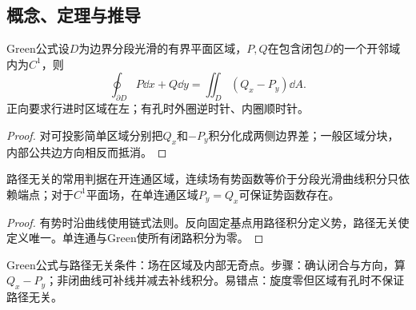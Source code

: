 \subsection{概念、定理与推导}

\begin{theorem}{Green公式}设$D$为边界分段光滑的有界平面区域，$P,Q$在包含闭包$\overline D$的一个开邻域内为$C^1$，则
\begin{equation}\oint_{\partial D}P\dd x+Q\dd y=\iint_D(Q_x-P_y)\dd A.\end{equation}
正向要求行进时区域在左；有孔时外圈逆时针、内圈顺时针。\end{theorem}
\begin{proof}对可投影简单区域分别把$Q_x$和$-P_y$积分化成两侧边界差；一般区域分块，内部公共边方向相反而抵消。\end{proof}
\begin{theorem}{路径无关的常用判据}在开连通区域，连续场有势函数等价于分段光滑曲线积分只依赖端点；对于$C^1$平面场，在单连通区域$P_y=Q_x$可保证势函数存在。\end{theorem}
\begin{proof}有势时沿曲线使用链式法则。反向固定基点用路径积分定义势，路径无关使定义唯一。单连通与Green使所有闭路积分为零。\end{proof}

\begin{method}{Green公式与路径无关}条件：场在区域及内部无奇点。步骤：确认闭合与方向，算$Q_x-P_y$；非闭曲线可补线并减去补线积分。易错点：旋度零但区域有孔时不保证路径无关。\end{method}

